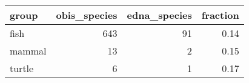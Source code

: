 \begin{longtable}{lrrr}
  \hline
group & obis\_species & edna\_species & fraction \\ 
  \hline
fish & 643 &  91 & 0.14 \\ 
  mammal &  13 &   2 & 0.15 \\ 
  turtle &   6 &   1 & 0.17 \\ 
   \hline
\hline
\end{longtable}
